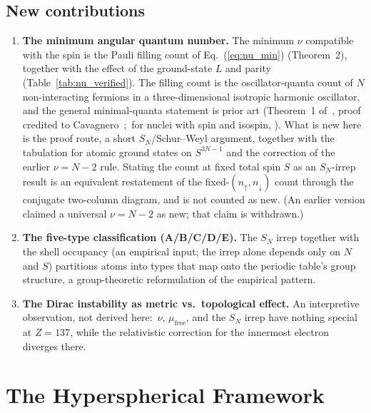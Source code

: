 \documentclass[aps,prl,twocolumn,superscriptaddress,longbibliography]{revtex4-2}
\newcommand{\mufree}{\mu_{\mathrm{free}}}
\begin{document}
\subsection{New contributions}

\begin{enumerate}
  \item \textbf{The minimum angular quantum number.}  The minimum
    $\nu$ compatible with the spin is the Pauli filling count of
    Eq.~(\ref{eq:nu_min}) (Theorem~2), together with the effect of the
    ground-state $L$ and parity (Table~\ref{tab:nu_verified}).  The
    filling count is the oscillator-quanta count of $N$ non-interacting
    fermions in a three-dimensional isotropic harmonic oscillator, and
    the general minimal-quanta statement is prior art (Theorem~1
    of~\cite{Rittenhouse2006}, proof credited to
    Cavagnero~\cite{Cavagnero1986};\ for nuclei with spin and isospin,
    \cite{FabreDeLaRipelle2004}).  What is new here is the proof
    route, a short $S_N$/Schur--Weyl argument, together with the
    tabulation for atomic ground states on $S^{3N-1}$ and the
    correction of the earlier $\nu = N-2$ rule.  Stating the count at
    fixed total spin $S$ as an $S_N$-irrep result is an equivalent
    restatement of the fixed-$(n_\uparrow, n_\downarrow)$ count through
    the conjugate two-column diagram, and is not counted as new.  (An earlier
    version claimed a universal $\nu = N-2$ as new; that claim is
    withdrawn.)

  \item \textbf{The five-type classification (A/B/C/D/E).}  The
    $S_N$ irrep together with the shell occupancy (an empirical input;
    the irrep alone depends only on $N$ and $S$) partitions atoms
    into types that map onto the periodic table's group structure,
    a group-theoretic reformulation of the empirical pattern.

  \item \textbf{The Dirac instability as metric vs.\ topological
    effect.}  An interpretive observation, not derived here:\ $\nu$,
    $\mufree$, and the $S_N$ irrep have nothing special at $Z = 137$,
    while the relativistic correction for the innermost electron
    diverges there.
\end{enumerate}


\section{The Hyperspherical Framework}
\label{sec:framework}
\end{document}
